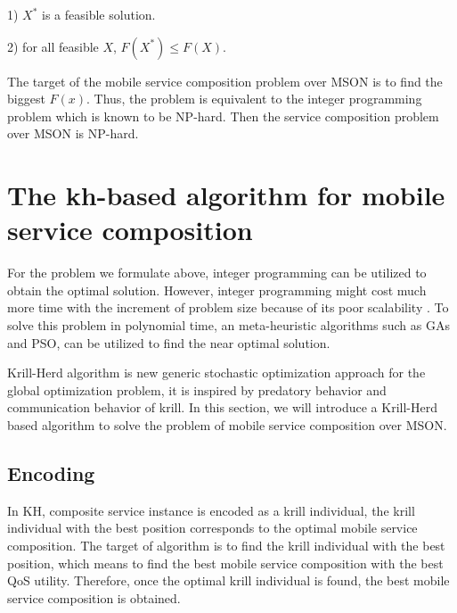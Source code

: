 \documentclass[10pt,journal,compsoc]{IEEEtran}
\begin{document}
1) $X^*$ is a feasible solution.

​2) for all feasible $X$, $F(X^*) \le F(X)$. 

The target of the mobile service composition problem over MSON is to find the biggest $F(x)$. Thus, the problem is equivalent to the integer programming problem which is known to be NP-hard. Then the service composition problem over MSON is NP-hard.

\section{The kh-based algorithm for mobile service composition}
For the problem we formulate above, integer programming can be utilized to obtain the optimal solution. However, integer programming might cost much more time with the increment of problem size because of its poor scalability \cite{nemhauser1988integer}. To solve this problem in polynomial time, an meta-heuristic algorithms such as GAs and PSO, can be utilized to find the near optimal solution.

Krill-Herd algorithm \cite{gandomi2012krill} is new generic stochastic optimization approach for the global optimization problem, it is inspired by predatory behavior and communication behavior of krill. 
In this section, we will introduce a Krill-Herd based algorithm to solve the problem of mobile service composition over MSON.


\subsection{Encoding}
In KH, composite service instance is encoded as a krill individual, the krill individual with the best position corresponds to the optimal mobile service composition. The target of algorithm is to find the krill individual with the best position, which means to find the best mobile service composition with the best QoS utility. Therefore, once the optimal krill individual is found, the best mobile service composition is obtained.
\end{document}
